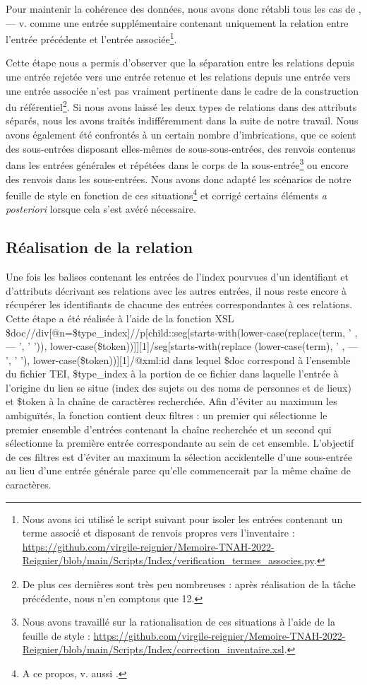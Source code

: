 \documentclass[a4paper,12pt,twoside]{book}
\begin{document}
	\noindent Pour maintenir la cohérence des données, nous avons donc rétabli tous les cas de \og{} , — v. \fg{} comme une entrée supplémentaire contenant uniquement la relation entre l'entrée précédente et l'entrée associée\footnote{Nous avons ici utilisé le script suivant pour isoler les entrées contenant un terme associé et disposant de renvois propres vers l'inventaire : \url{https://github.com/virgile-reignier/Memoire-TNAH-2022-Reignier/blob/main/Scripts/Index/verification_termes_associes.py}.}. 
	
	Cette étape nous a permis d'observer que la séparation entre les relations depuis une entrée rejetée vers une entrée retenue et les relations depuis une entrée vers une entrée associée n'est pas vraiment pertinente dans le cadre de la construction du référentiel\footnote{De plus ces dernières sont très peu nombreuses : après réalisation de la tâche précédente, nous n'en comptons que 12.}. Si nous avons laissé les deux types de relations dans des attributs séparés, nous les avons traités indifféremment dans la suite de notre travail. Nous avons également été confrontés à un certain nombre d'imbrications, que ce soient des sous-entrées disposant elles-mêmes de sous-sous-entrées, des renvois contenus dans les entrées générales et répétées dans le corps de la sous-entrée\footnote{Nous avons travaillé sur la rationalisation de ces situations à l'aide de la feuille de style : \url{https://github.com/virgile-reignier/Memoire-TNAH-2022-Reignier/blob/main/Scripts/Index/correction_inventaire.xsl}.} ou encore des renvois dans les sous-entrées. Nous avons donc adapté les scénarios de notre feuille de style en fonction de ces situations\footnote{A ce propos, v. aussi \cite{reignier_lindex_2022}.} et corrigé certains éléments \textit{a posteriori} lorsque cela s'est avéré nécessaire.
	
	\subsection{Réalisation de la relation}
	
	Une fois les balises contenant les entrées de l'index pourvues d'un identifiant et d'attributs décrivant ses relations avec les autres entrées, il nous reste encore à récupérer les identifiants de chacune des entrées correspondantes à ces relations. Cette étape a été réalisée à l'aide de la fonction XSL \og \$doc//div[@n=\$type\_index]//p[child::seg[starts-with(lower-case(replace(term, ' , — ', ' ')), lower-case(\$token))]][1]/seg[starts-with(replace (lower-case(term), ' , — ', ' '), lower-case(\$token))][1]/@xml:id\fg{} dans lequel \$doc correspond à l'ensemble du fichier TEI, \$type\_index à la portion de ce fichier dans laquelle l'entrée à l'origine du lien se situe (index des sujets ou des noms de personnes et de lieux) et \$token à la chaîne de caractères recherchée. Afin d'éviter au maximum les ambiguïtés, la fonction contient deux filtres : un premier qui sélectionne le premier ensemble d'entrées contenant la chaîne recherchée et un second qui sélectionne la première entrée correspondante au sein de cet ensemble. L'objectif de ces filtres est d'éviter au maximum la sélection accidentelle d'une sous-entrée au lieu d'une entrée générale parce qu'elle commencerait par la même chaîne de caractères.
	
\end{document}
